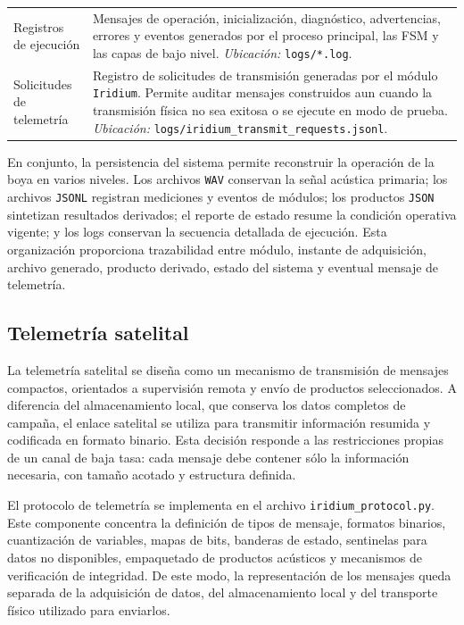 \begin{table}[htbp]
\begin{tabularx}{\textwidth}{@{}>{\raggedright\arraybackslash}p{}>{\raggedright\arraybackslash}X@{}}
Registros de ejecución &
Mensajes de operación, inicialización, diagnóstico, advertencias, errores y eventos generados por el proceso principal, las FSM y las capas de bajo nivel. \emph{Ubicación:} \texttt{logs/*.log}. \tabularnewline
\addlinespace[0.45em]

Solicitudes de telemetría &
Registro de solicitudes de transmisión generadas por el módulo \texttt{Iridium}. Permite auditar mensajes construidos aun cuando la transmisión física no sea exitosa o se ejecute en modo de prueba. \emph{Ubicación:} \texttt{logs/iridium\_transmit\_requests.jsonl}. \tabularnewline

\bottomrule
\end{tabularx}
\endgroup
\end{table}

En conjunto, la persistencia del sistema permite reconstruir la operación de la boya en varios niveles. Los archivos \texttt{WAV} conservan la señal acústica primaria; los archivos \texttt{JSONL} registran mediciones y eventos de módulos; los productos \texttt{JSON} sintetizan resultados derivados; el reporte de estado resume la condición operativa vigente; y los logs conservan la secuencia detallada de ejecución. Esta organización proporciona trazabilidad entre módulo, instante de adquisición, archivo generado, producto derivado, estado del sistema y eventual mensaje de telemetría.

\subsection{Telemetría satelital}
\label{subsec:telemetria_satelital_software}

La telemetría satelital se diseña como un mecanismo de transmisión de mensajes compactos, orientados a supervisión remota y envío de productos seleccionados. A diferencia del almacenamiento local, que conserva los datos completos de campaña, el enlace satelital se utiliza para transmitir información resumida y codificada en formato binario. Esta decisión responde a las restricciones propias de un canal de baja tasa: cada mensaje debe contener sólo la información necesaria, con tamaño acotado y estructura definida.

El protocolo de telemetría se implementa en el archivo \texttt{iridium\_protocol.py}. Este componente concentra la definición de tipos de mensaje, formatos binarios, cuantización de variables, mapas de bits, banderas de estado, sentinelas para datos no disponibles, empaquetado de productos acústicos y mecanismos de verificación de integridad. De este modo, la representación de los mensajes queda separada de la adquisición de datos, del almacenamiento local y del transporte físico utilizado para enviarlos.

